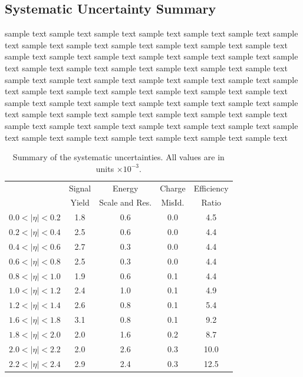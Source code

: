 \subsection{Systematic Uncertainty Summary}
sample text sample text sample text sample text sample text sample text sample
text sample text sample text sample text sample text sample text sample text
sample text sample text sample text sample text sample text sample text sample
text sample text sample text sample text sample text sample text sample text
sample text sample text sample text sample text sample text sample text sample
text sample text sample text sample text sample text sample text sample text
sample text sample text sample text sample text sample text sample text sample
text sample text sample text sample text sample text sample text sample text
sample text sample text sample text sample text sample text sample text sample
text sample text sample text sample text sample text sample text sample text

\begin{table}[tb]
 \begin{center}
   \begin{tabular}{lcccc}
      &Signal & Energy & Charge &  Efficiency \\
     & Yield & Scale and Res. & MisId. & Ratio \\ \hline
$0.0<|\eta|<0.2$ & 1.8 & 0.6 & 0.0 &  4.5 \\
$0.2<|\eta|<0.4$ & 2.5 & 0.6 & 0.0 &  4.4 \\
$0.4<|\eta|<0.6$ & 2.7 & 0.3 & 0.0 &  4.4 \\
$0.6<|\eta|<0.8$ & 2.5 & 0.3 & 0.0 &  4.4 \\
$0.8<|\eta|<1.0$ & 1.9 & 0.6 & 0.1 &  4.4 \\
$1.0<|\eta|<1.2$ & 2.4 & 1.0 & 0.1 &  4.9 \\
$1.2<|\eta|<1.4$ & 2.6 & 0.8 & 0.1 &  5.4 \\
$1.6<|\eta|<1.8$ & 3.1 & 0.8 & 0.1 &  9.2 \\
$1.8<|\eta|<2.0$ & 2.0 & 1.6 & 0.2 &  8.7 \\
$2.0<|\eta|<2.2$ & 2.0 & 2.6 & 0.3 & 10.0 \\
$2.2<|\eta|<2.4$ & 2.9 & 2.4 & 0.3 & 12.5 \\
    \end{tabular}
  \end{center}
 \caption{\label{tab:summarysyst}Summary of the systematic uncertainties. All values are in units $\times 10^{-3}$. }
\end{table}
                  

